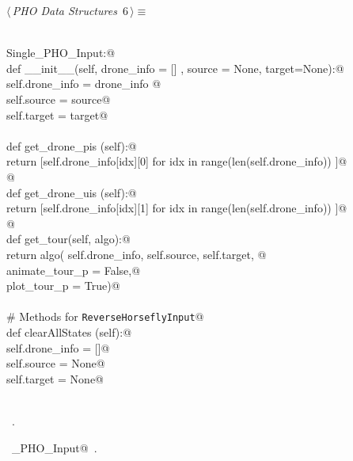 \documentclass[12.0pt]{report}
\begin{document}
\begin{flushleft} \small\label{scrap1}\raggedright\small
{} $\langle\,${\itshape PHO Data Structures}\nobreak\ {\footnotesize {6}}$\,\rangle\equiv$
\vspace{-1ex}
\begin{list}{}{} \item
\mbox{}\verb@@\\
\mbox{}\verb@class Single_PHO_Input:@\\
\mbox{}\verb@    def __init__(self, drone_info = [] , source = None, target=None):@\\
\mbox{}\verb@           self.drone_info = drone_info @\\
\mbox{}\verb@           self.source     = source@\\
\mbox{}\verb@           self.target     = target@\\
\mbox{}\verb@@\\
\mbox{}\verb@    def get_drone_pis (self):@\\
\mbox{}\verb@           return [self.drone_info[idx][0] for idx in range(len(self.drone_info)) ]@\\
\mbox{}\verb@           @\\
\mbox{}\verb@    def get_drone_uis (self):@\\
\mbox{}\verb@           return [self.drone_info[idx][1] for idx in range(len(self.drone_info)) ]@\\
\mbox{}\verb@         @\\
\mbox{}\verb@    def get_tour(self, algo):@\\
\mbox{}\verb@           return algo( self.drone_info, self.source, self.target, @\\
\mbox{}\verb@                        animate_tour_p = False,@\\
\mbox{}\verb@                        plot_tour_p    = True)@\\
\mbox{}\verb@@\\
\mbox{}\verb@    # Methods for \verb|ReverseHorseflyInput|@\\
\mbox{}\verb@    def clearAllStates (self):@\\
\mbox{}\verb@          self.drone_info = []@\\
\mbox{}\verb@          self.source = None@\\
\mbox{}\verb@          self.target = None@\\
\mbox{}\verb@@\\
\mbox{}\verb@@{\NWsep}
\end{list}
\vspace{-1.5ex}
\footnotesize
\begin{list}{}{\setlength{\itemsep}{-\parsep}\setlength{\itemindent}{-\leftmargin}}
\item \NWtxtMacroRefIn\ .
\item \NWtxtIdentsDefed\nobreak\  \verb@Single_PHO_Input@\nobreak\ .
\item{}
\end{list}
\vspace{4ex}
\end{flushleft}
\end{document}
